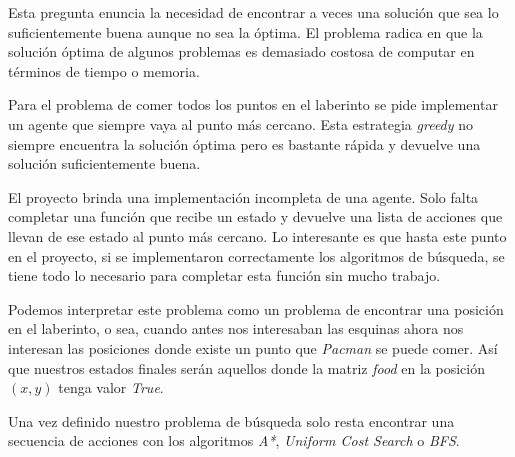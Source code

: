 \documentclass[12pt]{article}
\begin{document}
Esta pregunta enuncia la necesidad de encontrar a veces una soluci\'on que sea lo suficientemente buena aunque no sea la \'optima. El problema radica en que la soluci\'on \'optima de algunos problemas es demasiado costosa de computar en t\'erminos de tiempo o memoria.

Para el problema de comer todos los puntos en el laberinto se pide implementar un agente que siempre vaya al punto m\'as cercano. Esta estrategia \emph{greedy} no siempre encuentra la soluci\'on \'optima pero es bastante r\'apida y devuelve una soluci\'on suficientemente buena.

El proyecto brinda una implementaci\'on incompleta de una agente. Solo falta completar una funci\'on que recibe un estado y devuelve una lista de acciones que llevan de ese estado al punto m\'as cercano. Lo interesante es que hasta este punto en el proyecto, si se implementaron correctamente los algoritmos de b\'usqueda, se tiene todo lo necesario para completar esta funci\'on sin mucho trabajo.

Podemos interpretar este problema como un problema de encontrar una posici\'on en el laberinto, o sea, cuando antes nos interesaban las esquinas ahora nos interesan las posiciones donde existe un punto que \emph{Pacman} se puede comer. As\'i que nuestros estados finales ser\'an aquellos donde la matriz \emph{food} en la posici\'on $(x, y)$ tenga valor \emph{True}.

Una vez definido nuestro problema de b\'usqueda solo resta encontrar una secuencia de acciones con los algoritmos \emph{A*}, \emph{Uniform Cost Search} o \emph{BFS}.    
\end{document}
